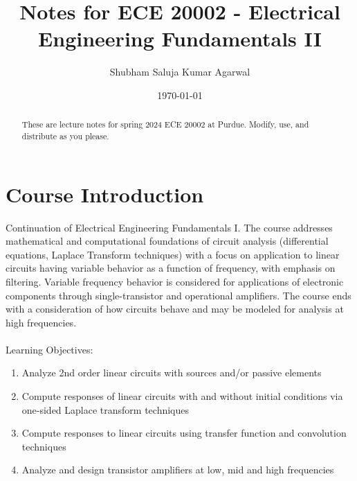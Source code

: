 \documentclass[nobib]{tufte-handout}
\title{Notes for ECE 20002 - Electrical Engineering Fundamentals II}
\author[Shubham Saluja Kumar Agarwal]{Shubham Saluja Kumar Agarwal}
\date{\today}  %
\begin{document}
\maketitle

\begin{abstract}
    These are lecture notes for spring 2024 ECE 20002 at Purdue. Modify, use, and distribute as you please.
\end{abstract}

\tableofcontents

\section{Course Introduction}

Continuation of Electrical Engineering Fundamentals I. The course
addresses mathematical and computational foundations of circuit analysis
(differential equations, Laplace Transform techniques) with a focus on
application to linear circuits having variable behavior as a function of
frequency, with emphasis on filtering. Variable frequency behavior is
considered for applications of electronic components through single-transistor
and operational amplifiers. The course ends with a consideration of how
circuits behave and may be modeled for analysis at high frequencies.\\~\\
Learning Objectives:
\begin{enumerate}
    \item Analyze 2nd order linear circuits with sources and/or passive elements
    \item Compute responses of linear circuits with and without initial conditions via
          one-sided Laplace transform techniques
    \item Compute responses to linear circuits using transfer function and convolution
          techniques
    \item Analyze and design transistor amplifiers at low, mid and high frequencies
\end{enumerate}

\pagebreak
\end{document}
